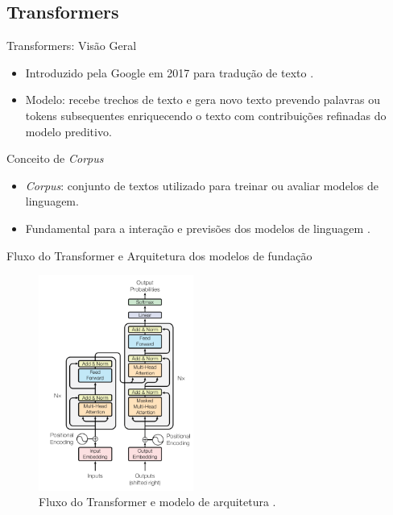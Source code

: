 \documentclass{beamer}
\begin{document}
\subsection{Transformers}

\begin{frame}{Transformers: Visão Geral}
    \begin{itemize}
        \item Introduzido pela Google em 2017 para tradução de texto \cite{Attention-Is-All-You-Need}.
        \item Modelo: recebe trechos de texto e gera novo texto prevendo palavras ou tokens subsequentes enriquecendo o texto com contribuições refinadas do modelo preditivo\cite{holtzman2019curious}.
    \end{itemize}
\end{frame}

\begin{frame}{Conceito de \textit{Corpus}}
    \begin{itemize}
        \item \textit{Corpus}: conjunto de textos utilizado para treinar ou avaliar modelos de linguagem.
        \item Fundamental para a interação e previsões dos modelos de linguagem \cite{Foundations-of-Statistical-Natural-Language-Processing}.
    \end{itemize}
\end{frame}

\begin{frame}{Fluxo do Transformer e Arquitetura dos modelos de fundação}
    \begin{figure}[!h]
        \centering
        \includegraphics[width=2in]{images/The Transformer - model architecture.png}
        \caption{Fluxo do Transformer e modelo de arquitetura \cite{Attention-Is-All-You-Need}.}
        \label{fig:arquiteturaTransformer}
    \end{figure}
\end{frame}
\end{document}

